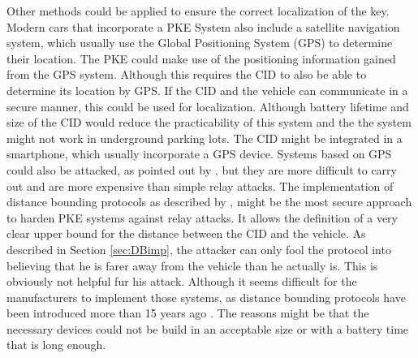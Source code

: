 	Other methods could be applied to ensure the correct localization of the key.
	Modern cars that incorporate a PKE System also include a satellite navigation system,
	which usually use the Global Positioning System (GPS) to determine their location.
	The PKE could make use of the positioning information gained from the GPS system.
	Although this requires the CID to also be able to determine its location by GPS.
	If the CID and the vehicle can communicate in a secure manner,
	this could be used for localization.
	Although battery lifetime and size of the CID would reduce the practicability of this system
	and the the system might not work in underground parking lots.
	The CID might be integrated in a smartphone,
	which usually incorporate a GPS device.
	Systems based on GPS could also be attacked,
	as pointed out by \cite{someAttacksPKES},
	but they are more difficult to carry out and are more expensive than simple relay attacks.
	The implementation of distance bounding protocols as described by \cite{secPos},
	might be the most secure approach to harden PKE systems against relay attacks.
	It allows the definition of a very clear upper bound for the distance between
	the CID and the vehicle.
	As described in Section \ref{sec:DBimp},
	the attacker can only fool the protocol into believing that he is farer away from the
	vehicle than he actually is.
	This is obviously not helpful fur his attack.
	Although it seems difficult for the manufacturers to implement those systems,
	as distance bounding protocols have been introduced more than 15 years ago  \cite{distanceBoundingProtocols}.
	The reasons might be that the necessary devices could not be build in an acceptable
	size or with a battery time that is long enough.
	